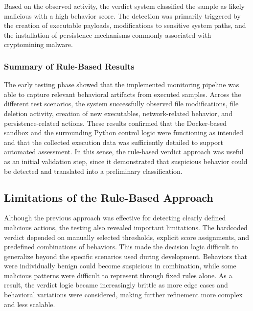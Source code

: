 Based on the observed activity, the verdict system classified the sample as likely malicious with a high behavior score. The detection was primarily triggered by the creation of executable payloads, modifications to sensitive system paths, and the installation of persistence mechanisms commonly associated with cryptomining malware. 







\newpage



\subsubsection{Summary of Rule-Based Results}
\noindent
The early testing phase showed that the implemented monitoring pipeline was able to capture relevant behavioral artifacts from executed samples. Across the different test scenarios, the system successfully observed file modifications, file deletion activity, creation of new executables, network-related behavior, and persistence-related actions. These results confirmed that the Docker-based sandbox and the surrounding Python control logic were functioning as intended and that the collected execution data was sufficiently detailed to support automated assessment. In this sense, the rule-based verdict approach was useful as an initial validation step, since it demonstrated that suspicious behavior could be detected and translated into a preliminary classification.

\subsection{Limitations of the Rule-Based Approach}
\noindent
Although the previous approach was effective for detecting clearly defined malicious actions, the testing also revealed important limitations. The hardcoded verdict depended on manually selected thresholds, explicit score assignments, and predefined combinations of behaviors. This made the decision logic difficult to generalize beyond the specific scenarios used during development. Behaviors that were individually benign could become suspicious in combination, while some malicious patterns were difficult to represent through fixed rules alone. As a result, the verdict logic became increasingly brittle as more edge cases and behavioral variations were considered, making further refinement more complex and less scalable.

